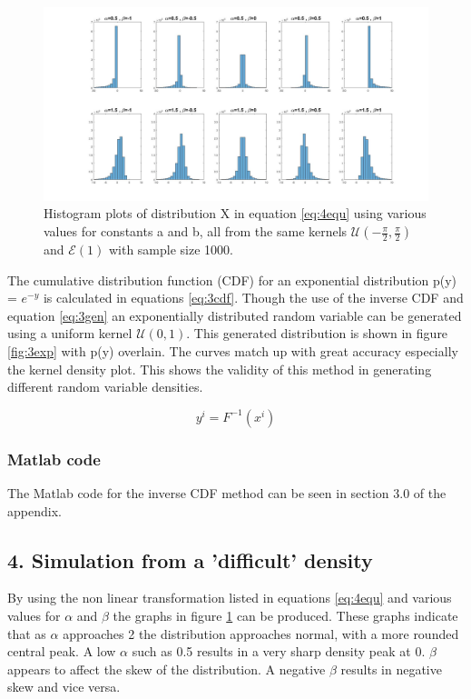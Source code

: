 \documentclass[twoside,twocolumn]{article}
\begin{document}
\begin{figure}[h]
  \centering
    \includegraphics[width=\textwidth ]{4dist}
  \caption{Histogram plots of distribution X in equation \ref{eq:4equ} using various values for constants a and b, all from the same kernels $\mathcal{U}(-\frac{\pi}{2},\frac{\pi}{2})$ and $\mathcal{E}(1)$ with sample size 1000.}
  \label{fig:4dist}
\end{figure}

The cumulative distribution function (CDF) for an exponential distribution p(y) = $e^{-y}$ is calculated in equations \ref{eq:3cdf}. Though the use of the inverse CDF and equation \ref{eq:3gen} an exponentially distributed random variable can be generated using a uniform kernel $\mathcal{U}(0,1)$. This generated distribution is shown in figure \ref{fig:3exp} with p(y) overlain. The curves match up with great accuracy especially the kernel density plot. This shows the validity of this method in generating different random variable densities.    

\begin{equation}
\label{eq:3gen}
y^{i} = F^{-1}(x^i)
\end{equation}

\subsubsection{Matlab code} %
The Matlab code for the inverse CDF method can be seen in section 3.0 of the appendix.

\subsection{4. Simulation from a 'difficult' density}




By using the non linear transformation listed in equations \ref{eq:4equ} and various values for $\alpha$ and $\beta$ the graphs in figure \ref{fig:4dist} can be produced. These graphs indicate that as $\alpha$ approaches 2 the distribution approaches normal, with a more rounded central peak. A low $\alpha$ such as 0.5 results in a very sharp density peak at 0. $\beta$ appears to affect the skew of the distribution. A negative $\beta$ results in negative skew and vice versa. 
\end{document}

